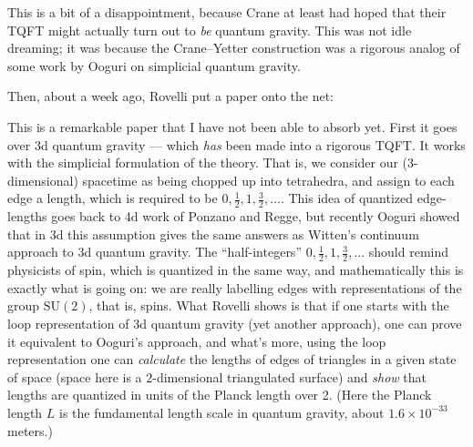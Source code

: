 \documentclass{article}
\def\tightlist{}
\renewcommand{\texttt}[1]{%
  \begingroup
  \ttfamily
  \begingroup\lccode`~=`/\lowercase{\endgroup\def~}{/\discretionary{}{}{}}%
  \begingroup\lccode`~=`[\lowercase{\endgroup\def~}{[\discretionary{}{}{}}%
  \begingroup\lccode`~=`.\lowercase{\endgroup\def~}{.\discretionary{}{}{}}%
  \catcode`/=\active\catcode`[=\active\catcode`.=\active
  \scantokens{#1\noexpand}%
  \endgroup
}
\begin{document}
This is a bit of a disappointment, because Crane at least had hoped that
their TQFT might actually turn out to \emph{be} quantum gravity. This
was not idle dreaming; it was because the Crane--Yetter construction was
a rigorous analog of some work by Ooguri on simplicial quantum gravity.

Then, about a week ago, Rovelli put a paper onto the net:


This is a remarkable paper that I have not been able to absorb yet.
First it goes over 3d quantum gravity --- which \emph{has} been made
into a rigorous TQFT. It works with the simplicial formulation of the
theory. That is, we consider our (3-dimensional) spacetime as being
chopped up into tetrahedra, and assign to each edge a length, which is
required to be \(0,\frac{1}{2},1,\frac{3}{2},\ldots\). This idea of quantized
edge-lengths goes back to 4d work of Ponzano and Regge, but recently
Ooguri showed that in 3d this assumption gives the same answers as
Witten's continuum approach to 3d quantum gravity. The ``half-integers''
\(0,\frac{1}{2},1,\frac{3}{2},\ldots\) should remind physicists of spin, which is
quantized in the same way, and mathematically this is exactly what is
going on: we are really labelling edges with representations of the
group \(\mathrm{SU}(2)\), that is, spins. What Rovelli shows is that if
one starts with the loop representation of 3d quantum gravity (yet
another approach), one can prove it equivalent to Ooguri's approach, and
what's more, using the loop representation one can \emph{calculate} the
lengths of edges of triangles in a given state of space (space here is a
\(2\)-dimensional triangulated surface) and \emph{show} that lengths are
quantized in units of the Planck length over 2. (Here the Planck length
\(L\) is the fundamental length scale in quantum gravity, about
\(1.6 \times 10^{-33}\) meters.)
\end{document}
